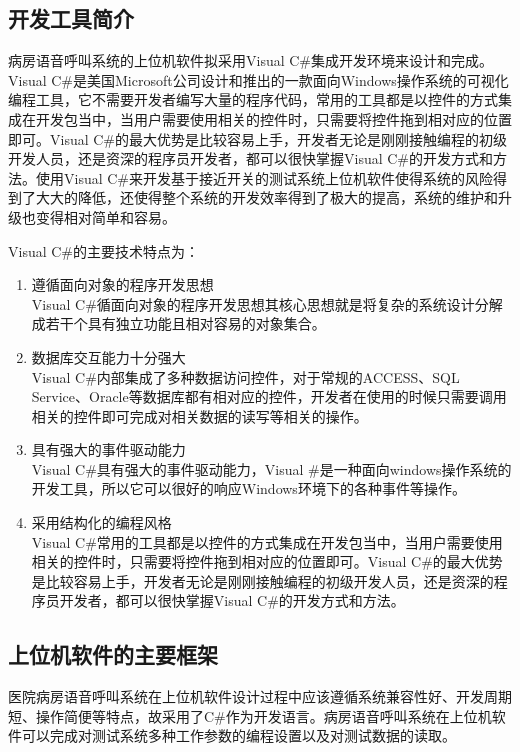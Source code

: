 \subsection{开发工具简介}
病房语音呼叫系统的上位机软件拟采用Visual C{\#}集成开发环境来设计和完成。Visual C{\#}是美国Microsoft公司设计和推出的一款面向Windows操作系统的可视化编程工具，它不需要开发者编写大量的程序代码，常用的工具都是以控件的方式集成在开发包当中，当用户需要使用相关的控件时，只需要将控件拖到相对应的位置即可。Visual C{\#}的最大优势是比较容易上手，开发者无论是刚刚接触编程的初级开发人员，还是资深的程序员开发者，都可以很快掌握Visual C{\#}的开发方式和方法。使用Visual C{\#}来开发基于接近开关的测试系统上位机软件使得系统的风险得到了大大的降低，还使得整个系统的开发效率得到了极大的提高，系统的维护和升级也变得相对简单和容易。

Visual C{\#}的主要技术特点为：
\begin{enumerate}
\item 遵循面向对象的程序开发思想\\
Visual C{\#}循面向对象的程序开发思想其核心思想就是将复杂的系统设计分解成若干个具有独立功能且相对容易的对象集合。

\item 数据库交互能力十分强大\\
Visual C{\#}内部集成了多种数据访问控件，对于常规的ACCESS、SQL Service、Oracle等数据库都有相对应的控件，开发者在使用的时候只需要调用相关的控件即可完成对相关数据的读写等相关的操作。

\item 具有强大的事件驱动能力\\
Visual C{\#}具有强大的事件驱动能力，Visual {\#}是一种面向windows操作系统的开发工具，所以它可以很好的响应Windows环境下的各种事件等操作。

\item 采用结构化的编程风格\\
Visual C{\#}常用的工具都是以控件的方式集成在开发包当中，当用户需要使用相关的控件时，只需要将控件拖到相对应的位置即可。Visual C{\#}的最大优势是比较容易上手，开发者无论是刚刚接触编程的初级开发人员，还是资深的程序员开发者，都可以很快掌握Visual C{\#}的开发方式和方法。
\end{enumerate}

\subsection{上位机软件的主要框架}
医院病房语音呼叫系统在上位机软件设计过程中应该遵循系统兼容性好、开发周期短、操作简便等特点，故采用了C{\#}作为开发语言。病房语音呼叫系统在上位机软件可以完成对测试系统多种工作参数的编程设置以及对测试数据的读取。

